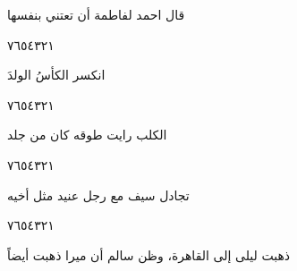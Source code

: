 \documentclass[11pt, a4paper]{article}
\begin{document}
{\vspace{0.5\baselineskip}\begin{flushright}
\textarabic{قال احمد لفاطمة أن تعتني بنفسها}
\end{flushright}

\begin{center}
        \hfill\textarabic{٧}\hfill\textarabic{٦}\hfill\textarabic{٥}\hfill\textarabic{٤}\hfill\textarabic{٣}\hfill\textarabic{٢}\hfill\textarabic{١}
        \end{center}


\vspace{0.5\baselineskip}\begin{flushright}
\textarabic{انكسر الكأسُ الولدَ}
\end{flushright}

\begin{center}
        \hfill\textarabic{٧}\hfill\textarabic{٦}\hfill\textarabic{٥}\hfill\textarabic{٤}\hfill\textarabic{٣}\hfill\textarabic{٢}\hfill\textarabic{١}
        \end{center}


\vspace{0.5\baselineskip}\begin{flushright}
\textarabic{الكلب رايت طوقه كان من جلد}
\end{flushright}

\begin{center}
        \hfill\textarabic{٧}\hfill\textarabic{٦}\hfill\textarabic{٥}\hfill\textarabic{٤}\hfill\textarabic{٣}\hfill\textarabic{٢}\hfill\textarabic{١}
        \end{center}

\vfill\clearpage

\vspace{0.5\baselineskip}\begin{flushright}
\textarabic{تجادل سيف مع رجل عنيد مثل أخيه}
\end{flushright}

\begin{center}
        \hfill\textarabic{٧}\hfill\textarabic{٦}\hfill\textarabic{٥}\hfill\textarabic{٤}\hfill\textarabic{٣}\hfill\textarabic{٢}\hfill\textarabic{١}
        \end{center}


\vspace{0.5\baselineskip}\begin{flushright}
\textarabic{ذهبت ليلى إلى القاهرة، وظن سالم أن ميرا ذهبت أيضاً}
\end{flushright}

}
\end{document}
